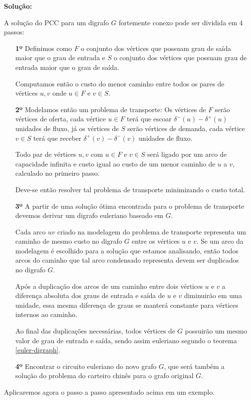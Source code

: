 \documentclass[12pt, a4paper]{article}
\begin{document}
    \begin{tcolorbox}
	\textbf{Solução:}

    A solução do PCC para um digrafo $G$ fortemente conexo pode ser dividida em 4 passos:

    \begin{enumerate}
        \item[\textbf{1º}] Definimos como $F$ o conjunto dos vértices que possuam grau de saída maior que o grau de entrada e $S$ o conjunto dos vértices que possuam grau de entrada maior que o grau de saída.

    Computamos então o custo do menor caminho entre todos os pares de vértices $u, v$ onde $u \in F$ e $v \in S$.


        \item[\textbf{2º}] Modelamos então um problema de transporte: 
        Os vértices de $F$ serão vértices de oferta, cada vértice $u \in F$ terá que escoar $\delta^-(u) - \delta^+(u)$ unidades de fluxo, já os vértices de $S$ serão vértices de demanda, cada vértice $v \in S$ terá que receber $\delta^+(v) - \delta^-(v)$ unidades de fluxo.

        Todo par de vértices $u, v$ com $u \in F$ e $v \in S$ será ligado por um arco de capacidade infinita e custo igual ao custo de um menor caminho de $u$ a $v$, calculado no primeiro passo.

        Deve-se então resolver tal problema de transporte minimizando o custo total.

        \item[\textbf{3º}] A partir de uma solução ótima encontrada para o problema de transporte devemos derivar um digrafo euleriano baseado em $G$.

            Cada arco $uv$ criado na modelagem do problema de transporte representa um caminho de mesmo custo no digrafo $G$ entre os vértices $u$ e $v$. Se um arco da modelagem é escolhido para a solução que estamos analisando, então todos arcos do caminho que tal arco condensado representa devem ser duplicados no digrafo $G$.

            Após a duplicação dos arcos de um caminho entre dois vértices $u$ e $v$ a diferença absoluta dos graus de entrada e saída de $u$ e $v$ diminuirão em uma unidade, essa mesma diferença de graus se manterá constante para vértices internos ao caminho. 

            Ao final das duplicações necessárias, todos vértices de $G$ possuirão um mesmo valor de grau de entrada e saída, sendo assim euleriano segundo o teorema \ref{euler-digraph}.

        \item[\textbf{4º}] Encontrar o circuito euleriano do novo grafo $G$, que será também a solução do problema do carteiro chinês para o grafo original $G$.

    \end{enumerate}

    \end{tcolorbox}
    Aplicaremos agora o passo a passo apresentado acima em um exemplo. 
\end{document}
